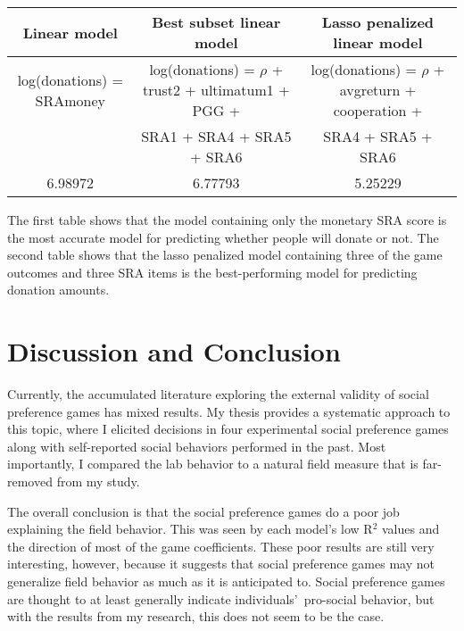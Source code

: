 \documentclass[12pt]{article}
\begin{document}
\begin{center}
\begin{adjustbox}{width=\textwidth}
\begin{tabular}{ c | c | c }
\hline \hline
Linear model & Best subset linear model & Lasso penalized linear model \\
\hline
log(donations) = SRAmoney & log(donations) = \(\rho\) + trust2 + ultimatum1 + PGG + & log(donations) = \(\rho\) + avgreturn + cooperation + \\
\small & SRA1 + SRA4 + SRA5 + SRA6 & SRA4 + SRA5 + SRA6 \\
\hline
6.98972 & 6.77793 & 5.25229 \\
\hline \hline
\end{tabular}
\end{adjustbox}
\end{center}

\doublespacing
\vspace{5mm} The first table shows that the model containing only the monetary SRA score is the most accurate model for predicting whether people will donate or not. The second table shows that the lasso penalized model containing three of the game outcomes and three SRA items is the best-performing model for predicting donation amounts. 

\section{Discussion and Conclusion}

Currently, the accumulated literature exploring the external validity of social preference games has mixed results. My thesis provides a systematic approach to this topic, where I elicited decisions in four experimental social preference games along with self-reported social behaviors performed in the past. Most importantly, I compared the lab behavior to a natural field measure that is far-removed from my study.

The overall conclusion is that the social preference games do a poor job explaining the field behavior. This was seen by each model\rq s low R$^{2}$ values and the direction of most of the game coefficients. These poor results are still very interesting, however, because it suggests that social preference games may not generalize field behavior as much as it is anticipated to. Social preference games are thought to at least generally indicate individuals\rq \ pro-social behavior, but with the results from my research, this does not seem to be the case.
\end{document}
